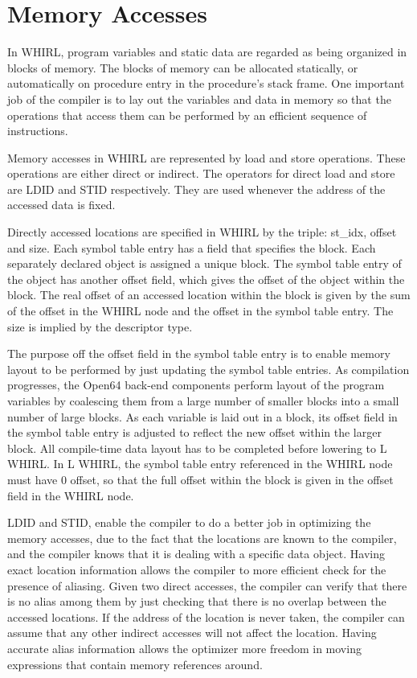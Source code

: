 \documentclass{article}
\begin{document}
\section{Memory Accesses}

In WHIRL, program variables and static data are regarded as being
organized in blocks of memory. The blocks of memory can be allocated
statically, or automatically on procedure entry in the procedure's
stack frame. One important job of the compiler is to lay out the
variables and data in memory so that the operations that access
them can be performed by an efficient sequence of instructions.

Memory accesses in WHIRL are represented by load and store operations.
These operations are either direct or indirect. The operators for
direct load and store are LDID and STID respectively. They are
used whenever the address of the accessed data is fixed.

Directly accessed locations are specified in WHIRL by the 
triple: st\_idx, offset and size. Each symbol table entry has a field that
specifies the block. Each separately declared object is assigned
a unique block. The symbol table entry of the object has another
offset field, which gives the offset of the object within the block.
The real offset of an accessed location within the block is given
by the sum of the offset in the WHIRL node and the offset in the
symbol table entry. The size is implied by the descriptor type.

The purpose off the offset field in the symbol table entry is to
enable memory layout to be performed by just updating the symbol
table entries. As compilation progresses, the Open64 back-end
components perform layout of the program variables by coalescing
them from a large number of smaller blocks into a small number of
large blocks. As each variable is laid out in a block, its offset
field in the symbol table entry is adjusted to reflect the new
offset within the larger block. All compile-time data layout has
to be completed before lowering to L WHIRL. In L WHIRL, the symbol
table entry referenced in the WHIRL node must have 0 offset, so that
the full offset within the block is given in the offset field in
the WHIRL node. 

LDID and STID, enable the compiler to do a better
job in optimizing the memory accesses, due to the fact that the
locations are known to the compiler, and the compiler knows that
it is dealing with a specific data object. Having exact location
information allows the compiler to more efficient
check for the presence of aliasing. Given two direct
accesses, the compiler can verify that there is no alias among
them by just checking that there is no overlap between the accessed
locations. If the address of the location is never taken, the
compiler can assume that any other indirect accesses will not affect
the location. Having accurate alias information allows the optimizer
more freedom in moving expressions that contain memory references
around. 
\end{document}
